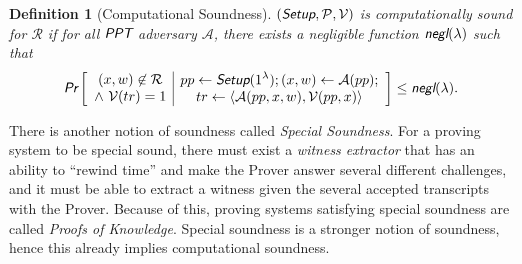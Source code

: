 \documentclass{article}
\newtheorem{definition}{Definition}[section]
\begin{document}
\begin{definition}[Computational Soundness]
$(\emph{\textsf{Setup}}, \mathcal{P}, \mathcal{V})$ is computationally sound for $\mathcal{R}$ if for all $\emph{\textsf{PPT}}$ adversary $\mathcal{A}$, there exists a negligible function $\emph{\textsf{negl}}(\lambda)$ such that
\begin{align*}
\emph{\textsf{Pr}}\left[
\begin{array}{c|c}
    \begin{gathered}
        (x,w)\not\in\mathcal{R}\\
        \wedge\ \mathcal{V}(tr) = 1
    \end{gathered}
    &
    \begin{gathered}
        pp\leftarrow\emph{\textsf{Setup}}(1^{\lambda}); (x, w)\leftarrow\mathcal{A}(pp); \\
        tr\leftarrow\langle\mathcal{A}(pp,x,w), \mathcal{V}(pp,x)\rangle
    \end{gathered}
\end{array}
\right]
\le \emph{\textsf{negl}}(\lambda).
\end{align*}
\end{definition}

There is another notion of soundness called \textit{Special Soundness}. For a proving system to be special sound, there must exist a \textit{witness extractor} that has an ability to ``rewind time'' and make the Prover answer several different challenges, and it must be able to extract a witness given the several accepted transcripts with the Prover. Because of this, proving systems satisfying special soundness are called \textit{Proofs of Knowledge}. Special soundness is a stronger notion of soundness, hence this already implies computational soundness.
\end{document}

